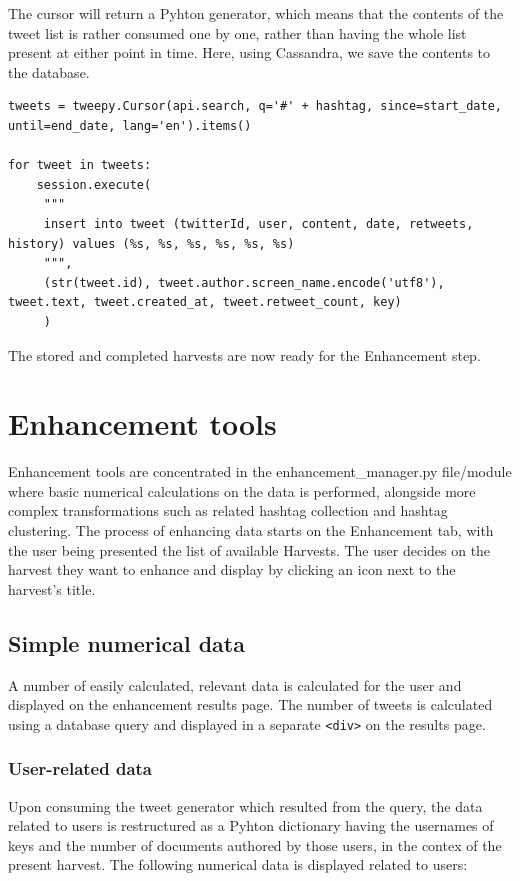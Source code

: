 \documentclass[12pt,a4paper,twoside]{report}
\begin{document}
The cursor will return a Pyhton generator, which means that the contents of the tweet list is rather consumed one by one, rather than having the whole list present at either point in time. Here, using Cassandra, we save the contents to the database.

\lstset{basicstyle=\small, breaklines=True}
\begin{lstlisting}
tweets = tweepy.Cursor(api.search, q='#' + hashtag, since=start_date, until=end_date, lang='en').items()

for tweet in tweets:
    session.execute(
     """
     insert into tweet (twitterId, user, content, date, retweets, history) values (%s, %s, %s, %s, %s, %s)
     """,
     (str(tweet.id), tweet.author.screen_name.encode('utf8'), tweet.text, tweet.created_at, tweet.retweet_count, key)
     )
\end{lstlisting}

The stored and completed harvests are now ready for the Enhancement step.

\section{Enhancement tools}
Enhancement tools are concentrated in the enhancement\_manager.py file/module where basic numerical calculations on the data is performed, alongside more complex transformations such as related hashtag collection and hashtag clustering. The process of enhancing data starts on the Enhancement tab, with the user being presented the list of available Harvests. The user decides on the harvest they want to enhance and display by clicking an icon next to the harvest's title.

\subsection{Simple numerical data}
A number of easily calculated, relevant data is calculated for the user and displayed on the enhancement results page. The number of tweets is calculated using a database query and displayed in a separate \texttt{<div>} on the results page.

\subsubsection{User-related data}
Upon consuming the tweet generator which resulted from the query, the data related to users is restructured as a Pyhton dictionary having the usernames of keys and the number of documents authored by those users, in the contex of the present harvest. The following numerical data is displayed related to users:
\end{document}
